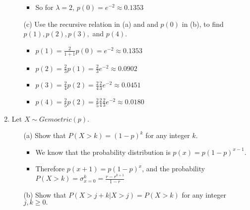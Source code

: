 \documentclass{article}
\begin{document}
\begin{enumerate}
\begin{itemize}
\begin{itemize}
        \item So for $\lambda=2$, $p(0) = e^{-2} \approx 0.1353$
        \end{itemize}
    \item [(c)] Use the recursive relation in (a) and and $p(0)$ in (b), to find $p(1),p(2),p(3),$ and $p(4)$.
        \begin{itemize}
        \item $p(1) = \frac{2}{1+1}p(0) = e^{-2} \approx 0.1353$
        \item $p(2) = \frac{2}{3}p(1) = \frac{2}{3} e^{-2} \approx 0.0902$
        \item $p(3) = \frac{2}{4}p(2) = \frac{2}{4} \frac{2}{3} e^{-2} \approx 0.0451$
        \item $p(4) = \frac{2}{5}p(2) = \frac{2}{5} \frac{2}{4} \frac{2}{3} e^{-2} \approx 0.0180$
        \end{itemize}
    \end{itemize}

\item Let $X \sim Gemoetric(p)$.
    \begin{enumerate}
    \item [(a)] Show that $P(X>k)=(1-p)^k$ for any integer $k$.
        \begin{itemize}
        \item We know that the probability distribution is $p(x) = p(1 - p)^{x-1}$.
        \item Therefore $p(x + 1) = p(1 - p)^x$, and the probability $P(X > k) = \sigma_{x=0}^k = \frac{r - r^{k+1}}{1-r}$

        \end{itemize}
    \item [(b)] Show that  $P(X> j+k|X > j)=P(X > k)$ for any integer $j,k\ge 0.$
    \end{enumerate}

\end{enumerate}
\end{document}
